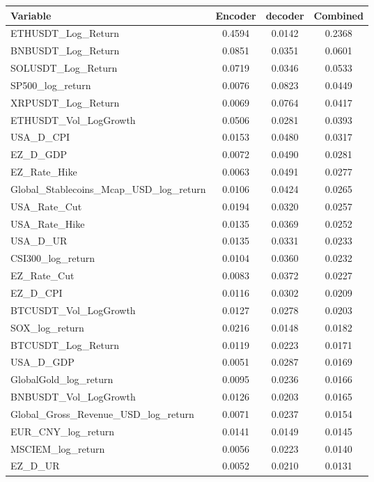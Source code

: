 \begin{tabular}{lccc}
  \toprule
  \textbf{Variable} & \textbf{Encoder} & \textbf{decoder} & \textbf{Combined} \\ 
  \midrule
  ETHUSDT\_Log\_Return & 0.4594 & 0.0142 & 0.2368 \\ 
  BNBUSDT\_Log\_Return & 0.0851 & 0.0351 & 0.0601 \\ 
  SOLUSDT\_Log\_Return & 0.0719 & 0.0346 & 0.0533 \\ 
  SP500\_log\_return & 0.0076 & 0.0823 & 0.0449 \\ 
  XRPUSDT\_Log\_Return & 0.0069 & 0.0764 & 0.0417 \\ 
  ETHUSDT\_Vol\_LogGrowth & 0.0506 & 0.0281 & 0.0393 \\ 
  USA\_D\_CPI & 0.0153 & 0.0480 & 0.0317 \\ 
  EZ\_D\_GDP & 0.0072 & 0.0490 & 0.0281 \\ 
  EZ\_Rate\_Hike & 0.0063 & 0.0491 & 0.0277 \\ 
  Global\_Stablecoins\_Mcap\_USD\_log\_return & 0.0106 & 0.0424 & 0.0265 \\ 
  USA\_Rate\_Cut & 0.0194 & 0.0320 & 0.0257 \\ 
  USA\_Rate\_Hike & 0.0135 & 0.0369 & 0.0252 \\ 
  USA\_D\_UR & 0.0135 & 0.0331 & 0.0233 \\ 
  CSI300\_log\_return & 0.0104 & 0.0360 & 0.0232 \\ 
  EZ\_Rate\_Cut & 0.0083 & 0.0372 & 0.0227 \\ 
  EZ\_D\_CPI & 0.0116 & 0.0302 & 0.0209 \\ 
  BTCUSDT\_Vol\_LogGrowth & 0.0127 & 0.0278 & 0.0203 \\ 
  SOX\_log\_return & 0.0216 & 0.0148 & 0.0182 \\ 
  BTCUSDT\_Log\_Return & 0.0119 & 0.0223 & 0.0171 \\ 
  USA\_D\_GDP & 0.0051 & 0.0287 & 0.0169 \\ 
  GlobalGold\_log\_return & 0.0095 & 0.0236 & 0.0166 \\ 
  BNBUSDT\_Vol\_LogGrowth & 0.0126 & 0.0203 & 0.0165 \\ 
  Global\_Gross\_Revenue\_USD\_log\_return & 0.0071 & 0.0237 & 0.0154 \\ 
  EUR\_CNY\_log\_return & 0.0141 & 0.0149 & 0.0145 \\ 
  MSCIEM\_log\_return & 0.0056 & 0.0223 & 0.0140 \\ 
  EZ\_D\_UR & 0.0052 & 0.0210 & 0.0131 \\ 

\end{tabular}
